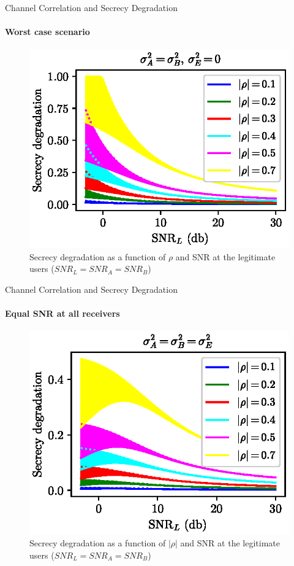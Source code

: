 \begin{frame}{Channel Correlation and Secrecy Degradation}
\framesubtitle{Worst case scenario}
\begin{figure}
    \centering
    \includegraphics[scale = 0.9]{figures/key_generation_and_spatial_seperation/bounds_degrad.eps}
    \vspace{-0.5cm}
    \caption{Secrecy degradation as a function of $\rho$ and {SNR} at the legitimate users ($SNR_L = SNR_A = SNR_B$)}
\end{figure}
\end{frame}

\begin{frame}{Channel Correlation and Secrecy Degradation}
\framesubtitle{Equal SNR at all receivers}
\begin{figure}
    \centering
    \includegraphics[scale = 0.9]{figures/key_generation_and_spatial_seperation/boundsDegrallequal.eps}
    \vspace{-0.5cm}
    \caption{Secrecy degradation as a function of $|\rho|$ and {SNR} at the legitimate users ($SNR_L = SNR_A = SNR_B$)}
\end{figure}
\end{frame}

